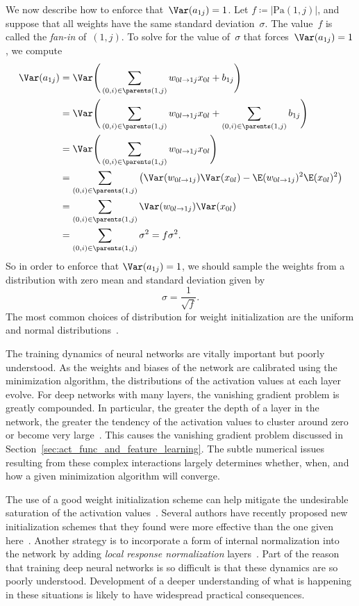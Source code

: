 \documentclass[11pt,a4paper]{article}
\numberwithin{equation}{section}
\newcommand{\weight}[2]{w_{#1 \rightarrow #2}}
\begin{document}
We now describe how to enforce that~$\Var(a_{1j}) = 1$. Let $f \coloneqq
|\text{Pa}(1, j)|$, and suppose that all weights have the same standard
deviation~$\sigma$. The value~$f$ is called the \emph{fan-in} of~$(1, j)$. To
solve for the value of~$\sigma$ that forces~$\Var(a_{1j}) = 1$, we compute
\begin{align*}
	\Var(a_{1j})
	&= \Var\Bigg(\sum_{(0, i) \in \parents(1, j)} \weight{0l}{1j} x_{0l} + b_{1j}\Bigg) \\
	&= \Var\Bigg(
		\sum_{(0, i) \in \parents(1, j)} \weight{0l}{1j} x_{0l} +
		\sum_{(0, i) \in \parents(1, j)} b_{1j}
	\Bigg) \\
	&= \Var\Bigg(\sum_{(0, i) \in \parents(1, j)} \weight{0l}{1j} x_{0l}\Bigg)\\
	&= \sum_{(0, i) \in \parents(1, j)} \left(
		\Var(\weight{0l}{1j}) \Var(x_{0l}) -
		\E(\weight{0l}{1j})^2 \E(x_{0l})^2
	\right) \\
	&= \sum_{(0, i) \in \parents(1, j)} \Var(\weight{0l}{1j}) \Var(x_{0l}) \\
	&= \sum_{(0, i) \in \parents(1, j)} \sigma^2 = f \sigma^2.
\end{align*}
So in order to enforce that $\Var(a_{1j}) = 1$, we should sample the weights
from a distribution with zero mean and standard deviation given by
\[
	\sigma = \frac{1}{\sqrt{f}}.
\]
The most common choices of distribution for weight initialization are the
uniform and normal distributions~\citep{lecun-98b, krizhevsky2012imagenet}.

The training dynamics of neural networks are vitally important but poorly
understood. As the weights and biases of the network are calibrated using the
minimization algorithm, the distributions of the activation values at each layer
evolve. For deep networks with many layers, the vanishing gradient problem is
greatly compounded. In particular, the greater the depth of a layer in the
network, the greater the tendency of the activation values to cluster around
zero or become very large~\citep{glorot2010understanding}. This causes the
vanishing gradient problem discussed in
Section~\ref{sec:act_func_and_feature_learning}. The subtle numerical issues
resulting from these complex interactions largely determines whether, when, and
how a given minimization algorithm will converge.

The use of a good weight initialization scheme can help mitigate the undesirable
saturation of the activation values~\citep{glorot2010understanding}. Several
authors have recently proposed new initialization schemes that they found were
more effective than the one given here~\citep{glorot2010understanding,
martens2010deep}. Another strategy is to incorporate a form of internal
normalization into the network by adding \emph{local response normalization}
layers~\citep{krizhevsky2012imagenet}. Part of the reason that training deep
neural networks is so difficult is that these dynamics are so poorly understood.
Development of a deeper understanding of what is happening in these situations
is likely to have widespread practical consequences.
\end{document}
